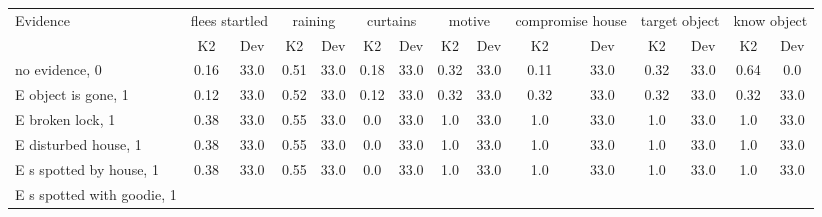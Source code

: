 \begin{table}\begin{tabular}{l|cc|cc|cc|cc|cc|cc|cc}\toprule\multirow{2}{*}{Evidence} & \multicolumn{2}{c}{flees startled}& \multicolumn{2}{c}{raining}& \multicolumn{2}{c}{curtains}& \multicolumn{2}{c}{motive}& \multicolumn{2}{c}{compromise house}& \multicolumn{2}{c}{target object}& \multicolumn{2}{c}{know object}\\& {K2} & {Dev}& {K2} & {Dev}& {K2} & {Dev}& {K2} & {Dev}& {K2} & {Dev}& {K2} & {Dev}& {K2} & {Dev}\\\midrule
no evidence, 0 & \cellcolor{Bittersweet}0.16&\cellcolor{Bittersweet}33.0&\cellcolor{Bittersweet}0.51&\cellcolor{Bittersweet}33.0&\cellcolor{Bittersweet}0.18&\cellcolor{Bittersweet}33.0&\cellcolor{Bittersweet}0.32&\cellcolor{Bittersweet}33.0&\cellcolor{Bittersweet}0.11&\cellcolor{Bittersweet}33.0&\cellcolor{Bittersweet}0.32&\cellcolor{Bittersweet}33.0&\cellcolor{Bittersweet}0.64&\cellcolor{Bittersweet}0.0\\E object is gone, 1 & \cellcolor{Bittersweet}0.12&\cellcolor{Bittersweet}33.0&\cellcolor{Bittersweet}0.52&\cellcolor{Bittersweet}33.0&\cellcolor{Bittersweet}0.12&\cellcolor{Bittersweet}33.0&\cellcolor{Bittersweet}0.32&\cellcolor{Bittersweet}33.0&\cellcolor{Bittersweet}0.32&\cellcolor{Bittersweet}33.0&\cellcolor{Bittersweet}0.32&\cellcolor{Bittersweet}33.0&\cellcolor{Bittersweet}0.32&\cellcolor{Bittersweet}33.0\\E broken lock, 1 & \cellcolor{Bittersweet}0.38&\cellcolor{Bittersweet}33.0&\cellcolor{Bittersweet}0.55&\cellcolor{Bittersweet}33.0&\cellcolor{Bittersweet}0.0&\cellcolor{Bittersweet}33.0&\cellcolor{Bittersweet}1.0&\cellcolor{Bittersweet}33.0&\cellcolor{Bittersweet}1.0&\cellcolor{Bittersweet}33.0&\cellcolor{Bittersweet}1.0&\cellcolor{Bittersweet}33.0&\cellcolor{Bittersweet}1.0&\cellcolor{Bittersweet}33.0\\E disturbed house, 1 & \cellcolor{Bittersweet}0.38&\cellcolor{Bittersweet}33.0&\cellcolor{Bittersweet}0.55&\cellcolor{Bittersweet}33.0&\cellcolor{Bittersweet}0.0&\cellcolor{Bittersweet}33.0&\cellcolor{Bittersweet}1.0&\cellcolor{Bittersweet}33.0&\cellcolor{Bittersweet}1.0&\cellcolor{Bittersweet}33.0&\cellcolor{Bittersweet}1.0&\cellcolor{Bittersweet}33.0&\cellcolor{Bittersweet}1.0&\cellcolor{Bittersweet}33.0\\E s spotted by house, 1 & \cellcolor{Bittersweet}0.38&\cellcolor{Bittersweet}33.0&\cellcolor{Bittersweet}0.55&\cellcolor{Bittersweet}33.0&\cellcolor{Bittersweet}0.0&\cellcolor{Bittersweet}33.0&\cellcolor{Bittersweet}1.0&\cellcolor{Bittersweet}33.0&\cellcolor{Bittersweet}1.0&\cellcolor{Bittersweet}33.0&\cellcolor{Bittersweet}1.0&\cellcolor{Bittersweet}33.0&\cellcolor{Bittersweet}1.0&\cellcolor{Bittersweet}33.0\\E s spotted with goodie, 1 & 
\end{tabular}
\end{table}
